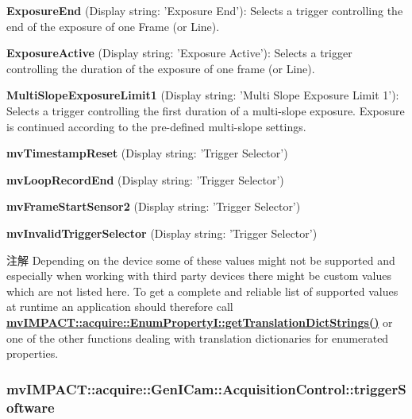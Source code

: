\begin{DoxyItemize}
\item {\bfseries Exposure\+End} (Display string\+: 'Exposure End')\+: Selects a trigger controlling the end of the exposure of one Frame (or Line).
\item {\bfseries Exposure\+Active} (Display string\+: 'Exposure Active')\+: Selects a trigger controlling the duration of the exposure of one frame (or Line).
\item {\bfseries Multi\+Slope\+Exposure\+Limit1} (Display string\+: 'Multi Slope Exposure Limit 1')\+: Selects a trigger controlling the first duration of a multi-\/slope exposure. Exposure is continued according to the pre-\/defined multi-\/slope settings.
\item {\bfseries mv\+Timestamp\+Reset} (Display string\+: 'Trigger Selector')
\item {\bfseries mv\+Loop\+Record\+End} (Display string\+: 'Trigger Selector')
\item {\bfseries mv\+Frame\+Start\+Sensor2} (Display string\+: 'Trigger Selector')
\item {\bfseries mv\+Invalid\+Trigger\+Selector} (Display string\+: 'Trigger Selector')
\end{DoxyItemize}

\begin{DoxyNote}{注解}
Depending on the device some of these values might not be supported and especially when working with third party devices there might be custom values which are not listed here. To get a complete and reliable list of supported values at runtime an application should therefore call {\bfseries \hyperlink{classmv_i_m_p_a_c_t_1_1acquire_1_1_enum_property_i_a0ba6ccbf5ee69784d5d0b537924d26b6}{mv\+I\+M\+P\+A\+C\+T\+::acquire\+::\+Enum\+Property\+I\+::get\+Translation\+Dict\+Strings()}} or one of the other functions dealing with translation dictionaries for enumerated properties. 
\end{DoxyNote}
\hypertarget{classmv_i_m_p_a_c_t_1_1acquire_1_1_gen_i_cam_1_1_acquisition_control_a41d20326d5f933501731f9c9ecbde1f0}{
\subsubsection[{trigger\+Software}]{ mv\+I\+M\+P\+A\+C\+T\+::acquire\+::\+Gen\+I\+Cam\+::\+Acquisition\+Control\+::trigger\+Software}}\label{classmv_i_m_p_a_c_t_1_1acquire_1_1_gen_i_cam_1_1_acquisition_control_a41d20326d5f933501731f9c9ecbde1f0}


